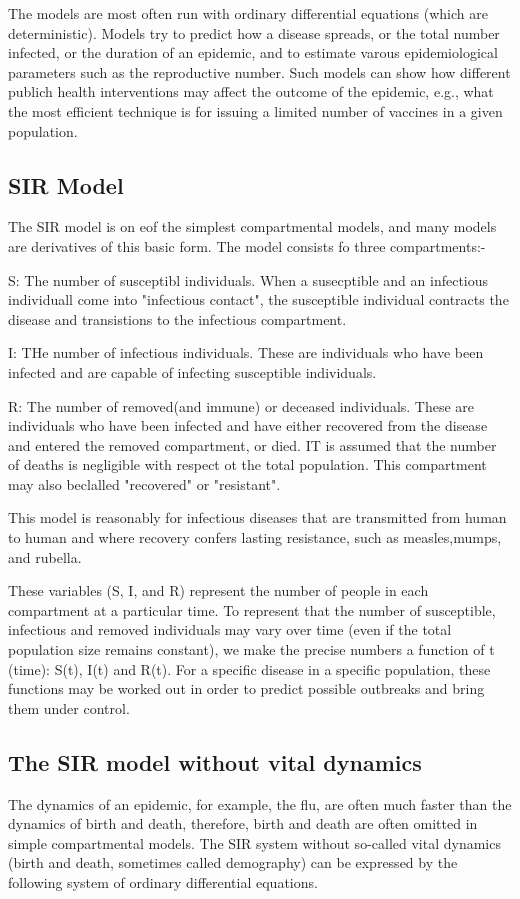 \documentclass[a4paper, 12pt]{article}
\begin{document}
The models are most often run with ordinary differential equations (which are deterministic). Models try to predict how a disease spreads, or the total number infected, or the duration of an epidemic, and to estimate varous epidemiological parameters such as the reproductive number. Such models can show how different publich health interventions may affect the outcome of the epidemic, e.g., what the most efficient technique is for issuing a limited number of vaccines in a given population. 

\subsection{SIR Model}
The SIR model is on eof the simplest compartmental models, and many models are derivatives of this basic form. The model consists fo three compartments:-

S: The number of susceptibl individuals. When a susecptible and an infectious individuall come into "infectious contact", the susceptible individual contracts the disease and transistions to the infectious compartment.

I: THe number of infectious individuals. These are individuals who have been infected and are capable of infecting susceptible individuals.

R: The number of removed(and immune) or deceased individuals. These are individuals who have been infected and have either recovered from the disease and entered the removed compartment, or died. IT is assumed that the number of deaths is negligible with respect ot the total population. This compartment may also beclalled "recovered" or "resistant".

This model is reasonably for infectious diseases that are transmitted from human to human and where recovery confers lasting resistance, such as measles,mumps, and rubella.

These variables (S, I, and R) represent the number of people in each compartment at a particular time. To represent that the number of susceptible, infectious and removed individuals may vary over time (even if the total population size remains constant), we make the precise numbers a function of t (time): S(t), I(t) and R(t). For a specific disease in a specific population, these functions may be worked out in order to predict possible outbreaks and bring them under control.

\subsection{The SIR model without vital dynamics}
The dynamics of an epidemic, for example, the flu, are often much faster than the dynamics of birth and death, therefore, birth and death are often omitted in simple compartmental models. The SIR system without so-called vital dynamics (birth and death, sometimes called demography) can be expressed by the following system of ordinary differential equations.
\end{document}
